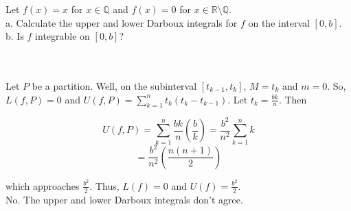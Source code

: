 Let $f(x)=x$ for $x\in\mathbb{Q}$ and $f(x)=0$ for $x\in\mathbb{R}\setminus\mathbb{Q}$.\\

a. Calculate the upper and lower Darboux integrals for $f$ on the interval $[0,b]$.\\

b. Is $f$ integrable on $[0,b]$?\\\\

\begin{solution}\renewcommand{\qedsymbol}{}\ \\
    Let $P$ be a partition. Well, on the subinterval $[t_{k-1},t_k]$, $M=t_k$ and $m=0$. So,
    $L(f,P)=0$ and $U(f,P)=\sum_{k=1}^nt_k(t_k-t_{k-1})$. Let $t_k=\frac{bk}{n}$. Then
    
    $$U(f,P)=\sum_{k=1}^n\frac{bk}{n}(\frac{b}{k})=\frac{b^2}{n^2}\sum_{k=1}^nk$$
    $$=\frac{b^2}{n^2}(\frac{n(n+1)}{2})$$
    
    which approaches $\frac{b^2}{2}$. Thus, $L(f)=0$ and $U(f)=\frac{b^2}{2}$.\\

    No. The upper and lower Darboux integrals don't agree.

\end{solution}
